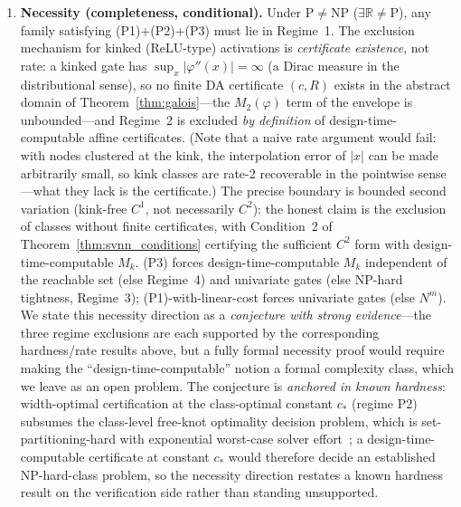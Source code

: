 \begin{theorem}
\begin{enumerate}
    \item \textbf{Necessity (completeness, conditional).} Under
    $\mathrm{P} \neq \mathrm{NP}$ ($\exists\mathbb{R} \neq \mathrm{P}$),
    any family satisfying (P1)+(P2)+(P3) must lie in Regime~1. The
    exclusion mechanism for kinked (ReLU-type) activations is
    \emph{certificate existence}, not rate: a kinked gate has
    $\sup_x |\varphi''(x)| = \infty$ (a Dirac measure in the
    distributional sense), so no finite DA certificate $(c,R)$ exists
    in the abstract domain of Theorem~\ref{thm:galois}---the
    $M_2(\varphi)$ term of the envelope is unbounded---and Regime~2 is
    excluded \emph{by definition} of design-time-computable affine
    certificates. (Note that a naive rate argument would fail: with
    nodes clustered at the kink, the interpolation error of $|x|$ can
    be made arbitrarily small, so kink classes are rate-2 recoverable
    in the pointwise sense---what they lack is the certificate.) The
    precise boundary is bounded second variation (kink-free $C^1$, not
    necessarily $C^2$): the honest claim is the exclusion of classes
    without finite certificates, with Condition~2 of
    Theorem~\ref{thm:svnn_conditions} certifying the sufficient $C^2$
    form with design-time-computable $M_k$. (P3) forces
    design-time-computable $M_k$ independent of the reachable set
    (else Regime~4) and univariate gates (else NP-hard tightness,
    Regime~3); (P1)-with-linear-cost forces univariate gates (else
    $N^m$). We state this necessity direction as a \emph{conjecture
    with strong evidence}---the three regime exclusions are each
    supported by the corresponding hardness/rate results above, but a
    fully formal necessity proof would require making the
    ``design-time-computable'' notion a formal complexity class, which
    we leave as an open problem. The conjecture is \emph{anchored in
    known hardness}: width-optimal certification at the class-optimal
    constant $c_*$ (regime P2) subsumes the class-level free-knot
    optimality decision problem, which is set-partitioning-hard with
    exponential worst-case solver effort~\cite{mohr2023globally,
    beliakov2004least}; a design-time-computable certificate at
    constant $c_*$ would therefore decide an established
    NP-hard-class problem, so the necessity direction restates a known
    hardness result on the verification side rather than standing
    unsupported.
\end{enumerate}
\end{theorem}

